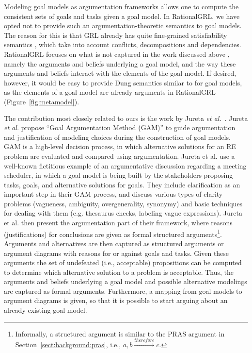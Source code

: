 Modeling goal models as argumentation frameworks allows one to compute the consistent sets of goals and tasks given a goal model. In RationalGRL, we have opted not to provide such an argumentation-theoretic semantics to goal models. The reason for this is that GRL already has quite fine-grained satisfiability semantics \cite{Amyot:2010:EGM:1841349.1841356}, which take into account conflicts, decompositions and dependencies. RationalGRL focuses on what is not captured in the work discussed above \cite{bagheri2011consolidating,MirbelVillata12}, namely the arguments and beliefs underlying a goal model, and the way these arguments and beliefs interact with the elements of the goal model. If desired, however, it would be easy to provide Dung semantics similar to \cite{bagheri2011consolidating,MirbelVillata12} for goal models, as the elements of a goal model are already arguments in RationalGRL (Figure~\ref{fig:metamodel}). 

The contribution most closely related to ours is the work by Jureta \emph{et al.}~\cite{Jureta:RE2008}. Jureta \emph{et al.} propose ``Goal Argumentation Method (GAM)'' to guide argumentation and justification of modeling choices during the construction of goal models. GAM is a high-level decision process, in which alternative solutions for an RE problem are evaluated and compared using argumentation. Jureta et al. use a well-known fictitious example of an argumentative discussion regarding a meeting scheduler, in which a goal model is being built by the stakeholders proposing tasks, goals, and alternative solutions for goals. They include clarification as an important step in their GAM process, and discuss various types of clarity problems (vagueness, ambiguity, overgenerality, synonymy) and basic techniques for dealing with them (e.g. thesaurus checks, labeling vague expressions). Jureta et al. then present the argumentation part of their framework, where reasons (justifications) for conclusions are given as formal structured arguments\footnote{Informally, a structured argument is similar to the PRAS argument in Section~\ref{sect:background:pras}, i.e., $a, b \xrightarrow{therefore} c$.}. Arguments and alternatives are then captured as structured arguments or argument diagrams with reasons for or against goals and tasks. Given these arguments the set of undefeated (i.e., acceptable) propositions can be computed to determine which alternative solution to a problem is acceptable. Thus, the arguments and beliefs underlying a goal model and possible alternative modelings are captured as formal arguments. Furthermore, a mapping from goal models to argument diagrams is given, so that it is possible to start arguing about an already existing goal model.

